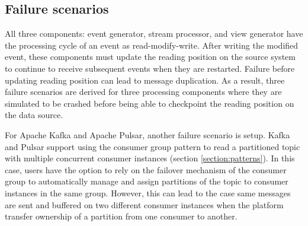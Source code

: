  
\subsection{Failure scenarios}
All three components: event generator, stream processor, and view generator have the processing cycle of an event as read-modify-write. After writing the modified event, these components must update the reading position on the source system to continue to receive subsequent events when they are restarted. Failure before updating reading position can lead to message duplication. As a result, three failure scenarios are derived for three processing components where they are simulated to be crashed before being able to checkpoint the reading position on the data source. 

For Apache Kafka and Apache Pulsar, another failure scenario is setup. Kafka and Pulsar support using the consumer group pattern to read a partitioned topic with multiple concurrent consumer instances (section \ref{section:patterns}). In this case, users have the option to rely on the failover mechanism of the consumer group to automatically manage and assign partitions of the topic to consumer instances in the same group. However, this can lead to the case same messages are sent and buffered on two different consumer instances when the platform transfer ownership of a partition from one consumer to another.

